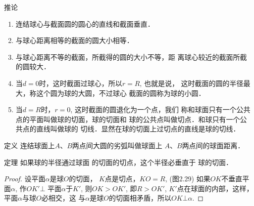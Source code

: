\begin{blk}{推论}
\begin{enumerate}
\item 连结球心与截面圆的圆心的直线和截面垂直．
\item 与球心距离相等的截面的圆大小相等．
\item 与球心距离不等的截面，所截得的圆的大小不等，距
离球心较近的截面所截的圆较大．
\item 当$d=0$时，这时截面过球心，所以$r=R$, 也就是说，
这时截面的圆的半径最大，称这个圆为球的大圆，不过球心
截面的圆称为球的小圆．
\item 当$d=R$时，$r=0$, 这时截面的圆退化为一个点，我们
称和球面只有一个公共点的平面叫做球的切面，球的切面和
球的公共点叫做切点．和球只有一个公共点的直线叫做球的
切线．显然在球的切面上过切点的直线是球的切线．
\end{enumerate}
    
\end{blk}

\begin{blk}{定义} 
    连结球面上$A$、$B$两点间大圆的劣弧叫做球面上
$A$、$B$两点间的球面距离．
\end{blk}

\begin{blk}
    {定理} 如果球的半径通过球面
    的切面的切点，这个半径必垂直于
    球的切面．
\end{blk}

\begin{figure}[htp]
    \centering
{}   
    \caption{}
\end{figure}

\begin{proof}
    设平面$\alpha$是球$O$的切面，
    $K$点是切点，$KO=R$, (图2.29)
    如果$OK$不垂直平面$\alpha$, 作$OK'\bot$
    平面$\alpha$于$K'$, 则$OK>OK'$, 即$R>OK'$, $K'$点在球面的内部，这样，平面$\alpha$与球$O$必相交，这
与$\alpha$是球$O$的切面相矛盾，所以$OK\bot\alpha$.
\end{proof}

